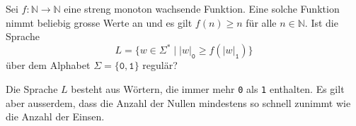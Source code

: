 Sei $f\colon \mathbb{N}\to\mathbb{N}$ eine streng monoton wachsende Funktion.
Eine solche Funktion nimmt beliebig grosse Werte an und es 
gilt $f(n) \ge n$ für alle $n\in\mathbb{N}$.
Ist die Sprache
\[
L=
\{
w\in\Sigma^*
\mid
|w|_{\texttt{0}}
\ge f(|w|_{\texttt{1}})
\}
\]
über dem Alphabet $\Sigma=\{\texttt{0},\texttt{1}\}$ regulär?

\begin{hinweis}
Die Sprache $L$ besteht aus Wörtern, die immer mehr \texttt{0} als \texttt{1}
enthalten.
Es gilt aber ausserdem, dass die Anzahl der Nullen mindestens so schnell
zunimmt wie die Anzahl der Einsen.
\end{hinweis}



